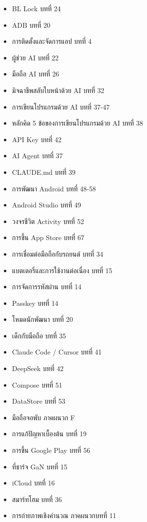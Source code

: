 


\begin{itemize}
  \item BL Lock บทที่ 24
  \item ADB บทที่ 20
  \item การติดตั้งและจัดการแอป บทที่ 4
  \item ผู้ช่วย AI บทที่ 22
  \item มือถือ AI บทที่ 26
  \item มิจฉาชีพสลับใบหน้าด้วย AI บทที่ 32
  \item การเขียนโปรแกรมด้วย AI บทที่ 37-47
  \item หลักคิด 5 ข้อของการเขียนโปรแกรมด้วย AI บทที่ 38
  \item API Key บทที่ 42
  \item AI Agent บทที่ 37
  \item CLAUDE.md บทที่ 39
  \item การพัฒนา Android บทที่ 48-58
  \item Android Studio บทที่ 49
  \item วงจรชีวิต Activity บทที่ 52
  \item การขึ้น App Store บทที่ 67
\end{itemize}


\begin{itemize}
  \item การเชื่อมต่อมือถือกับรถยนต์ บทที่ 34
  \item แบตเตอรี่และการใช้งานต่อเนื่อง บทที่ 15
  \item การจัดการรหัสผ่าน บทที่ 14
  \item Passkey บทที่ 14
  \item โหมดนักพัฒนา บทที่ 20
  \item เด็กกับมือถือ บทที่ 35
  \item Claude Code / Cursor บทที่ 41
  \item DeepSeek บทที่ 42
  \item Compose บทที่ 51
  \item DataStore บทที่ 53
\end{itemize}


\begin{itemize}
  \item มือถือจอพับ ภาคผนวก F
  \item การแก้ปัญหาเบื้องต้น บทที่ 19
  \item การขึ้น Google Play บทที่ 56
  \item ที่ชาร์จ GaN บทที่ 15
  \item iCloud บทที่ 16
  \item สมาร์ทโฮม บทที่ 36
  \item การถ่ายภาพเชิงคำนวณ ภาคผนวกบทที่ 11
\end{itemize}

